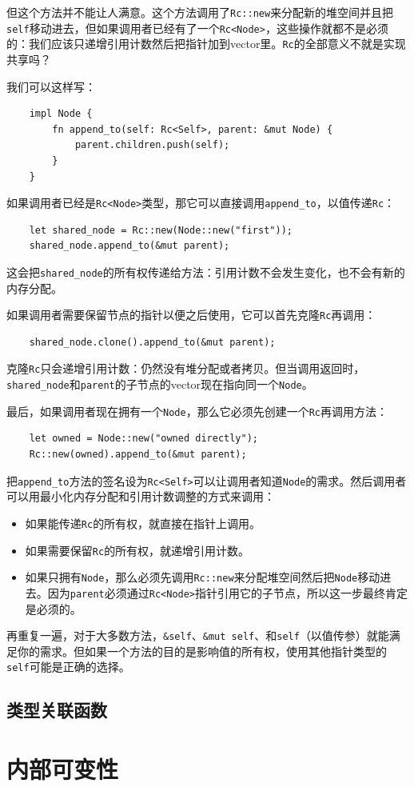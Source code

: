 但这个方法并不能让人满意。这个方法调用了\texttt{Rc::new}来分配新的堆空间并且把\texttt{self}移动进去，但如果调用者已经有了一个\texttt{Rc<Node>}，这些操作就都不是必须的：我们应该只递增引用计数然后把指针加到vector里。\texttt{Rc}的全部意义不就是实现共享吗？

我们可以这样写：
\begin{verbatim}
    impl Node {
        fn append_to(self: Rc<Self>, parent: &mut Node) {
            parent.children.push(self);
        }
    }
\end{verbatim}

如果调用者已经是\texttt{Rc<Node>}类型，那它可以直接调用\texttt{append\_to}，以值传递\texttt{Rc}：
\begin{verbatim}
    let shared_node = Rc::new(Node::new("first"));
    shared_node.append_to(&mut parent);
\end{verbatim}

这会把\texttt{shared\_node}的所有权传递给方法：引用计数不会发生变化，也不会有新的内存分配。

如果调用者需要保留节点的指针以便之后使用，它可以首先克隆\texttt{Rc}再调用：
\begin{verbatim}
    shared_node.clone().append_to(&mut parent);
\end{verbatim}

克隆\texttt{Rc}只会递增引用计数：仍然没有堆分配或者拷贝。但当调用返回时，\texttt{shared\_node}和\texttt{parent}的子节点的vector现在指向同一个\texttt{Node}。

最后，如果调用者现在拥有一个\texttt{Node}，那么它必须先创建一个\texttt{Rc}再调用方法：
\begin{verbatim}
    let owned = Node::new("owned directly");
    Rc::new(owned).append_to(&mut parent);
\end{verbatim}

把\texttt{append\_to}方法的签名设为\texttt{Rc<Self>}可以让调用者知道\texttt{Node}的需求。然后调用者可以用最小化内存分配和引用计数调整的方式来调用：
\begin{itemize}
    \item 如果能传递\texttt{Rc}的所有权，就直接在指针上调用。
    \item 如果需要保留\texttt{Rc}的所有权，就递增引用计数。
    \item 如果只拥有\texttt{Node}，那么必须先调用\texttt{Rc::new}来分配堆空间然后把\texttt{Node}移动进去。因为\texttt{parent}必须通过\texttt{Rc<Node>}指针引用它的子节点，所以这一步最终肯定是必须的。
\end{itemize}

再重复一遍，对于大多数方法，\texttt{\&self}、\texttt{\&mut self}、和\texttt{self}（以值传参）就能满足你的需求。但如果一个方法的目的是影响值的所有权，使用其他指针类型的\texttt{self}可能是正确的选择。

\subsection{类型关联函数}

\section{内部可变性}\label{intermut}
